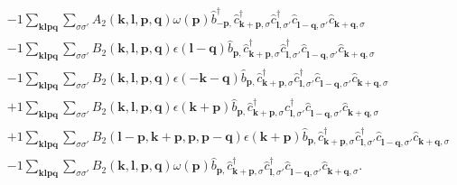 \begin{align*}
	&-1 \sum_{ \mathbf{k} \mathbf{l} \mathbf{p} \mathbf{q} } \sum_{ \sigma \sigma' } A_2( \mathbf{k}, \mathbf{l}, \mathbf{p}, \mathbf{q} )  \omega( \mathbf{p} )   \hat{b}_{ -\mathbf{p}, }^\dagger  \hat{c}_{ \mathbf{k}+\mathbf{p}, \sigma }^\dagger  \hat{c}_{ \mathbf{l}, \sigma' }^\dagger  \hat{c}_{ \mathbf{l}-\mathbf{q}, \sigma' }^{\phantom{\dagger}} \hat{c}_{ \mathbf{k}+\mathbf{q}, \sigma }^{\phantom{\dagger}}  \\
	&-1 \sum_{ \mathbf{k} \mathbf{l} \mathbf{p} \mathbf{q} } \sum_{ \sigma \sigma' } B_2( \mathbf{k}, \mathbf{l}, \mathbf{p}, \mathbf{q} )  \epsilon( \mathbf{l}-\mathbf{q} )   \hat{b}_{ \mathbf{p}, }^{\phantom{\dagger}} \hat{c}_{ \mathbf{k}+\mathbf{p}, \sigma }^\dagger  \hat{c}_{ \mathbf{l}, \sigma' }^\dagger  \hat{c}_{ \mathbf{l}-\mathbf{q}, \sigma' }^{\phantom{\dagger}} \hat{c}_{ \mathbf{k}+\mathbf{q}, \sigma }^{\phantom{\dagger}}  \\
	&-1 \sum_{ \mathbf{k} \mathbf{l} \mathbf{p} \mathbf{q} } \sum_{ \sigma \sigma' } B_2( \mathbf{k}, \mathbf{l}, \mathbf{p}, \mathbf{q} )  \epsilon( -\mathbf{k}-\mathbf{q} )   \hat{b}_{ \mathbf{p}, }^{\phantom{\dagger}} \hat{c}_{ \mathbf{k}+\mathbf{p}, \sigma }^\dagger  \hat{c}_{ \mathbf{l}, \sigma' }^\dagger  \hat{c}_{ \mathbf{l}-\mathbf{q}, \sigma' }^{\phantom{\dagger}} \hat{c}_{ \mathbf{k}+\mathbf{q}, \sigma }^{\phantom{\dagger}}  \\
	&+1 \sum_{ \mathbf{k} \mathbf{l} \mathbf{p} \mathbf{q} } \sum_{ \sigma \sigma' } B_2( \mathbf{k}, \mathbf{l}, \mathbf{p}, \mathbf{q} )  \epsilon( \mathbf{k}+\mathbf{p} )   \hat{b}_{ \mathbf{p}, }^{\phantom{\dagger}} \hat{c}_{ \mathbf{k}+\mathbf{p}, \sigma }^\dagger  \hat{c}_{ \mathbf{l}, \sigma' }^\dagger  \hat{c}_{ \mathbf{l}-\mathbf{q}, \sigma' }^{\phantom{\dagger}} \hat{c}_{ \mathbf{k}+\mathbf{q}, \sigma }^{\phantom{\dagger}}  \\
	&+1 \sum_{ \mathbf{k} \mathbf{l} \mathbf{p} \mathbf{q} } \sum_{ \sigma \sigma' } B_2( \mathbf{l}-\mathbf{p}, \mathbf{k}+\mathbf{p}, \mathbf{p}, \mathbf{p}-\mathbf{q} )  \epsilon( \mathbf{k}+\mathbf{p} )   \hat{b}_{ \mathbf{p}, }^{\phantom{\dagger}} \hat{c}_{ \mathbf{k}+\mathbf{p}, \sigma }^\dagger  \hat{c}_{ \mathbf{l}, \sigma' }^\dagger  \hat{c}_{ \mathbf{l}-\mathbf{q}, \sigma' }^{\phantom{\dagger}} \hat{c}_{ \mathbf{k}+\mathbf{q}, \sigma }^{\phantom{\dagger}}  \\
	&-1 \sum_{ \mathbf{k} \mathbf{l} \mathbf{p} \mathbf{q} } \sum_{ \sigma \sigma' } B_2( \mathbf{k}, \mathbf{l}, \mathbf{p}, \mathbf{q} )  \omega( \mathbf{p} )   \hat{b}_{ \mathbf{p}, }^{\phantom{\dagger}} \hat{c}_{ \mathbf{k}+\mathbf{p}, \sigma }^\dagger  \hat{c}_{ \mathbf{l}, \sigma' }^\dagger  \hat{c}_{ \mathbf{l}-\mathbf{q}, \sigma' }^{\phantom{\dagger}} \hat{c}_{ \mathbf{k}+\mathbf{q}, \sigma }^{\phantom{\dagger}} 
. \end{align*}
